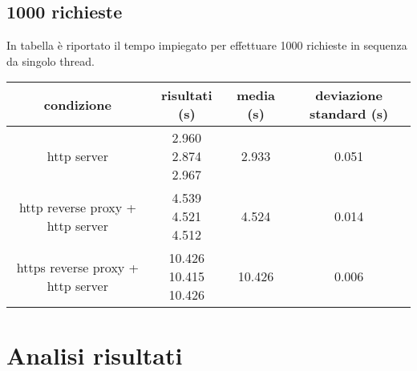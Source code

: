 \subsection{1000 richieste}
In tabella è riportato il tempo impiegato per effettuare 1000 richieste in sequenza da singolo thread.
\begin{center}
  \begin{tabular}{|c|c|c|c|}
    \hline
    condizione & risultati (s) & media (s) & deviazione standard (s) \\
    \hline
    \hline
    http server & \makecell {2.960 \\ 2.874 \\ 2.967} & 2.933 & 0.051 \\
    \hline
    http reverse proxy + http server & \makecell {4.539 \\ 4.521 \\ 4.512} & 4.524 & 0.014 \\
    \hline
    https reverse proxy + http server & \makecell {10.426 \\ 10.415 \\ 10.426} & 10.426 & 0.006 \\
    \hline
  \end{tabular}
\end{center}

\begin{center}
\end{center}

\section{Analisi risultati}
